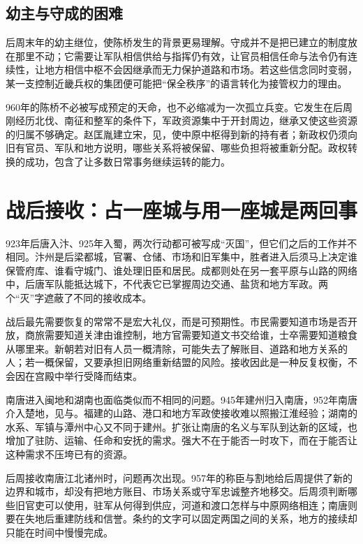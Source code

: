 \subsection{幼主与守成的困难}

后周末年的幼主继位，使陈桥发生的背景更易理解。守成并不是把已建立的制度放在那里不动；它需要让军队相信供给与指挥仍有效，让官员相信任命与法令仍有连续性，让地方相信中枢不会因继承而无力保护道路和市场。若这些信念同时变弱，某一支控制近畿兵权的集团便可能把“保全秩序”的语言转化为接管权力的理由。

960年的陈桥不必被写成预定的天命，也不必缩减为一次孤立兵变。它发生在后周刚经历北伐、南征和整军的条件下，军政资源集中于开封周边，继承又使这些资源的归属不够确定。赵匡胤建立宋，见，使中原中枢得到新的持有者；新政权仍须向旧有官员、军队和地方说明，哪些关系将被保留、哪些负担将被重新分配。政权转换的成功，包含了让多数日常事务继续运转的能力。

\section{战后接收：占一座城与用一座城是两回事}

923年后唐入汴、925年入蜀，两次行动都可被写成“灭国”，但它们之后的工作并不相同。汴州是后梁都城，官署、仓储、市场和旧军集中，胜者进入后须马上决定谁保管府库、谁看守城门、谁处理旧臣和居民。成都则处在另一套平原与山路的网络中，后唐军队能抵达城下，不代表它已掌握周边交通、盐货和地方军政。两个“灭”字遮蔽了不同的接收成本。

战后最先需要恢复的常常不是宏大礼仪，而是可预期性。市民需要知道市场是否开放，商旅需要知道关津由谁控制，地方官需要知道文书交给谁，士卒需要知道粮食从哪里来。新朝若对旧有人员一概清除，可能失去了解账目、道路和地方关系的人；若一概保留，又要承担旧网络重新结盟的风险。接收因此是一种反复权衡，不会因在宫殿中举行受降而结束。

南唐进入闽地和湖南也面临类似而不相同的问题。945年建州归入南唐，952年南唐介入楚地，见与。福建的山路、港口和地方军政使接收难以照搬江淮经验；湖南的水系、军镇与潭州中心又不同于建州。扩张让南唐的名义与军队到达新的区域，也增加了驻防、运输、任命和安抚的需求。强大不在于能否一时攻下，而在于能否让这种需求不压垮已有的资源。

后周接收南唐江北诸州时，问题再次出现。957年的称臣与割地给后周提供了新的边界和城市，却没有把地方账目、市场关系或守军忠诚整齐地移交。后周须判断哪些旧官吏可以使用，驻军从何得到供应，河道和渡口怎样与中原网络相连；南唐则要在失地后重建防线和信誉。条约的文字可以固定两国之间的关系，地方的接续却只能在时间中慢慢完成。


